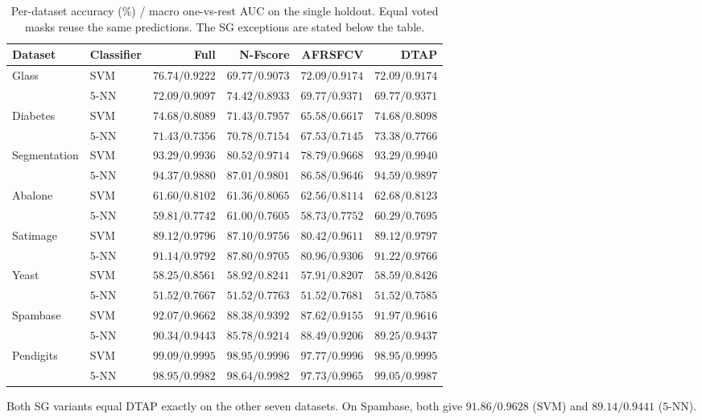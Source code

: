 \documentclass[]{interact}
\theoremstyle{plain}
\theoremstyle{definition}
\theoremstyle{remark}
\begin{document}
\begin{table}[htbp]
\centering\small\setlength{\tabcolsep}{4pt}
\caption{Per-dataset accuracy (\%) / macro one-vs-rest AUC on the single holdout. Equal voted masks reuse the same predictions. The SG exceptions are stated below the table.}\label{tab:acc}
\begin{tabular}{llrrrr}
\toprule
Dataset & Classifier & Full & N-Fscore & AFRSFCV & DTAP \\
\midrule
Glass & SVM & $76.74/0.9222$ & $69.77/0.9073$ & $72.09/0.9174$ & $72.09/0.9174$ \\
 & $5$-NN & $72.09/0.9097$ & $74.42/0.8933$ & $69.77/0.9371$ & $69.77/0.9371$ \\
Diabetes & SVM & $74.68/0.8089$ & $71.43/0.7957$ & $65.58/0.6617$ & $74.68/0.8098$ \\
 & $5$-NN & $71.43/0.7356$ & $70.78/0.7154$ & $67.53/0.7145$ & $73.38/0.7766$ \\
Segmentation & SVM & $93.29/0.9936$ & $80.52/0.9714$ & $78.79/0.9668$ & $93.29/0.9940$ \\
 & $5$-NN & $94.37/0.9880$ & $87.01/0.9801$ & $86.58/0.9646$ & $94.59/0.9897$ \\
Abalone & SVM & $61.60/0.8102$ & $61.36/0.8065$ & $62.56/0.8114$ & $62.68/0.8123$ \\
 & $5$-NN & $59.81/0.7742$ & $61.00/0.7605$ & $58.73/0.7752$ & $60.29/0.7695$ \\
Satimage & SVM & $89.12/0.9796$ & $87.10/0.9756$ & $80.42/0.9611$ & $89.12/0.9797$ \\
 & $5$-NN & $91.14/0.9792$ & $87.80/0.9705$ & $80.96/0.9306$ & $91.22/0.9766$ \\
Yeast & SVM & $58.25/0.8561$ & $58.92/0.8241$ & $57.91/0.8207$ & $58.59/0.8426$ \\
 & $5$-NN & $51.52/0.7667$ & $51.52/0.7763$ & $51.52/0.7681$ & $51.52/0.7585$ \\
Spambase & SVM & $92.07/0.9662$ & $88.38/0.9392$ & $87.62/0.9155$ & $91.97/0.9616$ \\
 & $5$-NN & $90.34/0.9443$ & $85.78/0.9214$ & $88.49/0.9206$ & $89.25/0.9437$ \\
Pendigits & SVM & $99.09/0.9995$ & $98.95/0.9996$ & $97.77/0.9996$ & $98.95/0.9995$ \\
 & $5$-NN & $98.95/0.9982$ & $98.64/0.9982$ & $97.73/0.9965$ & $99.05/0.9987$ \\
\bottomrule
\end{tabular}
\par\smallskip\begin{minipage}{0.97\textwidth}\footnotesize Both SG variants equal DTAP exactly on the other seven datasets. On Spambase, both give $91.86/0.9628$ (SVM) and $89.14/0.9441$ ($5$-NN). \end{minipage}
\end{table}
\end{document}

